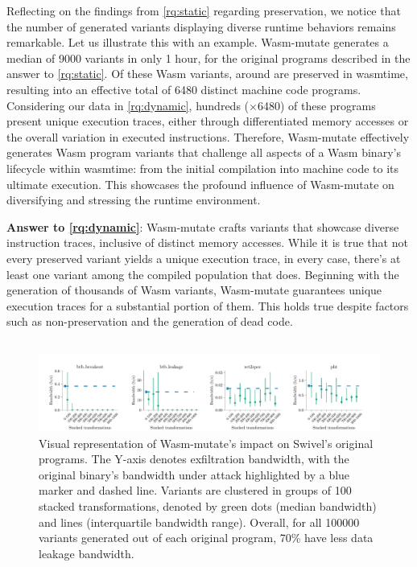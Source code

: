 \documentclass[sigplan,screen]{acmart}
\newcommand{\tool}{Wasm-mutate\xspace}
\newcommand{\wasm}{Wasm\xspace}
\begin{document}
Reflecting on the findings from \ref{rq:static} regarding preservation, we notice that the number of generated variants displaying diverse runtime behaviors remains remarkable. 
Let us illustrate this with an example.
\tool generates a median of 9000 variants in only 1 hour, for the original programs described in the answer to \ref{rq:static}. 
Of these \wasm variants, around \preserved are preserved in wasmtime, resulting into an effective total of 6480 distinct machine code programs.
Considering our data in \ref{rq:dynamic}, hundreds (\memratio$\times$6480) of these programs present unique execution traces, either through differentiated memory accesses or the overall variation in executed instructions. 
Therefore, \tool effectively generates \wasm program variants that challenge all aspects of a \wasm binary's lifecycle within wasmtime: from the initial compilation into machine code to its ultimate execution. 
This showcases the profound influence of \tool on diversifying and stressing the runtime environment.


\begin{tcolorbox}[boxrule=1pt,arc=.3em,boxsep=-1.3mm]
  \textbf{Answer to \ref{rq:dynamic}}:   \tool crafts variants that showcase diverse instruction traces, inclusive of distinct memory accesses. 
  While it is true that not every preserved variant yields a unique execution trace, in every case, there's at least one variant among the compiled population that does. 
  Beginning with the generation of thousands of \wasm variants, \tool guarantees unique execution traces for a substantial portion of them. 
  This holds true despite factors such as non-preservation and the generation of dead code. 
\end{tcolorbox}

\subsection{\rqdefensive}



\begin{figure}
    \centering
    \includegraphics[width=\linewidth]{plots/rq3/results.rq3.pdf}
    \caption{Visual representation of \tool's impact on Swivel's original programs. The Y-axis denotes exfiltration bandwidth, with the original binary's bandwidth under attack highlighted by a blue marker and dashed line. Variants are clustered in groups of 100 stacked transformations, denoted by green dots (median bandwidth) and lines (interquartile bandwidth range). Overall, for all 100000 variants generated out of each original program, 70\% have less data leakage bandwidth.}
  \label{attacks:impact}
\end{figure}
\end{document}
